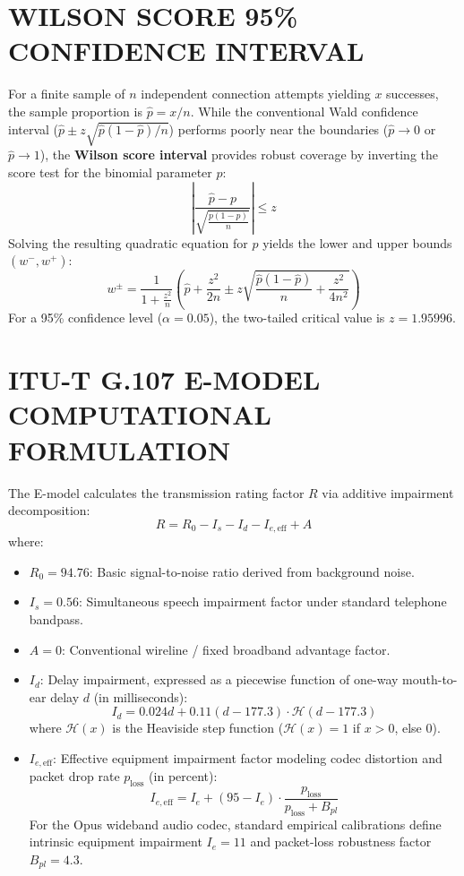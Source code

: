 \section{WILSON SCORE 95\% CONFIDENCE INTERVAL}
For a finite sample of $n$ independent connection attempts yielding $x$ successes, the sample proportion is $\hat{p} = x / n$. While the conventional Wald confidence interval ($\hat{p} \pm z\sqrt{\hat{p}(1-\hat{p})/n}$) performs poorly near the boundaries ($\hat{p} \to 0$ or $\hat{p} \to 1$), the \textbf{Wilson score interval} provides robust coverage by inverting the score test for the binomial parameter $p$:
\begin{equation}
    \left| \frac{\hat{p} - p}{\sqrt{\frac{p(1-p)}{n}}} \right| \le z
\end{equation}
Solving the resulting quadratic equation for $p$ yields the lower and upper bounds $(w^-, w^+)$:
\begin{equation}
    w^{\pm} = \frac{1}{1 + \frac{z^2}{n}} \left( \hat{p} + \frac{z^2}{2n} \pm z \sqrt{\frac{\hat{p}(1 - \hat{p})}{n} + \frac{z^2}{4n^2}} \right)
\end{equation}
For a 95\% confidence level ($\alpha = 0.05$), the two-tailed critical value is $z = 1.95996$.

\section{ITU-T G.107 E-MODEL COMPUTATIONAL FORMULATION}
The E-model calculates the transmission rating factor $R$ via additive impairment decomposition:
\begin{equation}
    R = R_0 - I_s - I_d - I_{e,\text{eff}} + A
\end{equation}
where:
\begin{itemize}
    \item $R_0 = 94.76$: Basic signal-to-noise ratio derived from background noise.
    \item $I_s = 0.56$: Simultaneous speech impairment factor under standard telephone bandpass.
    \item $A = 0$: Conventional wireline / fixed broadband advantage factor.
    \item $I_d$: Delay impairment, expressed as a piecewise function of one-way mouth-to-ear delay $d$ (in milliseconds):
    \begin{equation}
        I_d = 0.024 d + 0.11 (d - 177.3) \cdot \mathcal{H}(d - 177.3)
    \end{equation}
    where $\mathcal{H}(x)$ is the Heaviside step function ($\mathcal{H}(x) = 1$ if $x > 0$, else $0$).
    \item $I_{e,\text{eff}}$: Effective equipment impairment factor modeling codec distortion and packet drop rate $p_{\text{loss}}$ (in percent):
    \begin{equation}
        I_{e,\text{eff}} = I_e + (95 - I_e) \cdot \frac{p_{\text{loss}}}{p_{\text{loss}} + B_{pl}}
    \end{equation}
    For the Opus wideband audio codec, standard empirical calibrations define intrinsic equipment impairment $I_e = 11$ and packet-loss robustness factor $B_{pl} = 4.3$.
\end{itemize}

